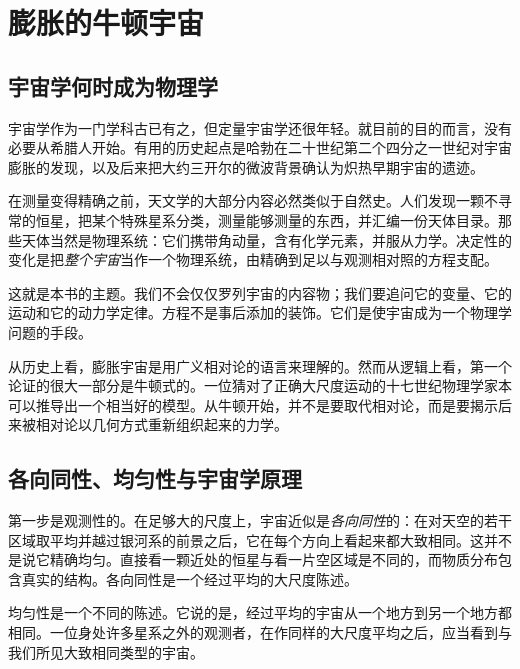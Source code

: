 \chapter{膨胀的牛顿宇宙}


\section{宇宙学何时成为物理学}

宇宙学作为一门学科古已有之，但定量宇宙学还很年轻。就目前的目的而言，没有必要从希腊人开始。有用的历史起点是哈勃在二十世纪第二个四分之一世纪对宇宙膨胀的发现，以及后来把大约三开尔的微波背景确认为炽热早期宇宙的遗迹。

在测量变得精确之前，天文学的大部分内容必然类似于自然史。人们发现一颗不寻常的恒星，把某个特殊星系分类，测量能够测量的东西，并汇编一份天体目录。那些天体当然是物理系统：它们携带角动量，含有化学元素，并服从力学。决定性的变化是把\emph{整个宇宙}当作一个物理系统，由精确到足以与观测相对照的方程支配。

这就是本书的主题。我们不会仅仅罗列宇宙的内容物；我们要追问它的变量、它的运动和它的动力学定律。方程不是事后添加的装饰。它们是使宇宙成为一个物理学问题的手段。

从历史上看，膨胀宇宙是用广义相对论的语言来理解的。然而从逻辑上看，第一个论证的很大一部分是牛顿式的。一位猜对了正确大尺度运动的十七世纪物理学家本可以推导出一个相当好的模型。从牛顿开始，并不是要取代相对论，而是要揭示后来被相对论以几何方式重新组织起来的力学。

\section{各向同性、均匀性与宇宙学原理}

第一步是观测性的。在足够大的尺度上，宇宙近似是\emph{各向同性}的：在对天空的若干区域取平均并越过银河系的前景之后，它在每个方向上看起来都大致相同。这并不是说它精确均匀。直接看一颗近处的恒星与看一片空区域是不同的，而物质分布包含真实的结构。各向同性是一个经过平均的大尺度陈述。

均匀性是一个不同的陈述。它说的是，经过平均的宇宙从一个地方到另一个地方都相同。一位身处许多星系之外的观测者，在作同样的大尺度平均之后，应当看到与我们所见大致相同类型的宇宙。

